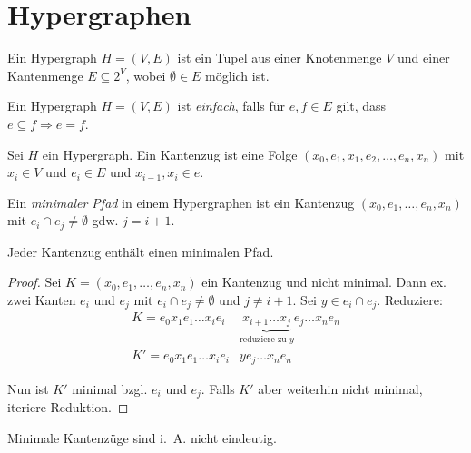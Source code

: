 \chapter{Hypergraphen}

\begin{definition}[Hypergraph]
    Ein Hypergraph $ H = (V, E) $ ist ein Tupel aus einer Knotenmenge $ V $ und einer Kantenmenge $ E \subseteq 2^V $, wobei $ \emptyset \in E $ möglich ist.
\end{definition}

\begin{definition}[Einfach]
    Ein Hypergraph $ H = (V, E) $ ist \textit{einfach}, falls für $ e, f \in E $ gilt, dass $ e \subseteq f \Rightarrow e = f $.
\end{definition}

\begin{definition}
    Sei $ H $ ein Hypergraph.
    Ein Kantenzug ist eine Folge $ (x_0, e_1, x_1, e_2, \dots, e_n, x_n) $ mit $ x_i \in V $ und $ e_i \in E $ und $ x_{i - 1}, x_i \in e $.
\end{definition}

\begin{definition}
    Ein \textit{minimaler Pfad} in einem Hypergraphen ist ein Kantenzug $ (x_0, e_1, \dots, e_n, x_n) $ mit $ e_i \cap e_j \ne \emptyset $ gdw. $ j = i + 1 $.
\end{definition}

\begin{lemma}
    Jeder Kantenzug enthält einen minimalen Pfad.
\end{lemma}

\begin{proof}
    Sei $ K = (x_0, e_1, \dots, e_n, x_n) $ ein Kantenzug und nicht minimal.
    Dann ex. zwei Kanten $ e_i $ und $ e_j $ mit $ e_i \cap e_j \ne \emptyset $ und $ j \ne i + 1 $.
    Sei $ y \in e_i \cap e_j $.
    Reduziere:
    \begin{align*}
        K = e_0 x_1 e_1 \dots x_i e_i & \underbrace{x_{i + 1} \dots x_j}_{\text{reduziere zu } y} e_j \dots x_n e_n \\
        K' = e_0 x_1 e_1 \dots x_i e_i & y e_j \dots x_n e_n
    \end{align*}

    Nun ist $ K' $ minimal bzgl. $ e_i $ und $ e_j $.
    Falls $ K' $ aber weiterhin nicht minimal, iteriere Reduktion.
\end{proof}

\begin{remark}
    Minimale Kantenzüge sind i.~A. nicht eindeutig.
\end{remark}

